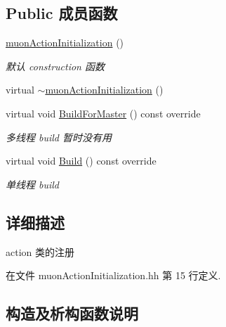 \subsection*{Public 成员函数}
\begin{DoxyCompactItemize}
\item 
\hyperlink{classmuonActionInitialization_ac2975dc863ed514556de9e291a3a655d}{muon\+Action\+Initialization} ()
\begin{DoxyCompactList}\small\item\em 默认 construction 函数 \end{DoxyCompactList}\item 
virtual \hyperlink{classmuonActionInitialization_af86f5507a8d33358f758e1ef65f73597}{$\sim$muon\+Action\+Initialization} ()
\item 
virtual void \hyperlink{classmuonActionInitialization_a6819e8906b517d01966731ccbbac388d}{Build\+For\+Master} () const override
\begin{DoxyCompactList}\small\item\em 多线程 build 暂时没有用 \end{DoxyCompactList}\item 
virtual void \hyperlink{classmuonActionInitialization_afa2c061aba623bc3dcdf417188b17492}{Build} () const override
\begin{DoxyCompactList}\small\item\em 单线程 build \end{DoxyCompactList}\end{DoxyCompactItemize}


\subsection{详细描述}
action 类的注册 

在文件 muon\+Action\+Initialization.\+hh 第 15 行定义.



\subsection{构造及析构函数说明}
\mbox{\label{classmuonActionInitialization_ac2975dc863ed514556de9e291a3a655d}} 
